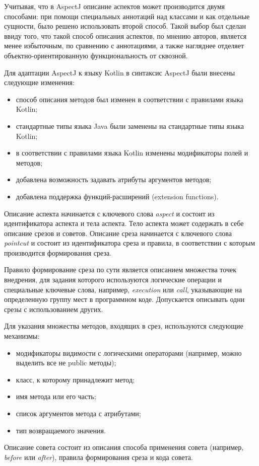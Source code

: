 \documentclass[conference]{IEEEtran}
\begin{document}
Учитывая, что в AspectJ описание аспектов может производится двумя способами:
при помощи специальных аннотаций над классами и как отдельные сущности, было
решено использовать второй способ.
Такой выбор был сделан ввиду того, что такой способ описания аспектов, по мнению
авторов, является менее избыточным, по сравнению с аннотациями, а также
нагляднее отделяет объектно-ориентированную функциональность от сквозной.

Для адаптации AspectJ к языку Kotlin в синтаксис AspectJ были внесены следующие
изменения:
\begin{itemize}
	\item способ описания методов был изменен в соответствии с правилами языка
	      Kotlin;
	\item стандартные типы языка Java были заменены на стандартные типы языка
		  Kotlin;
	\item в соответствии с правилами языка Kotlin изменены модификаторы полей и
	      методов;
	\item добавлена возможность задавать атрибуты аргументов методов;
	\item добавлена поддержка функций-расширений (extension functions).
\end{itemize}

Описание аспекта начинается с ключевого слова \textit{aspect} и состоит из 
идентификатора аспекта и тела аспекта.
Тело аспекта может содержать в себе описание срезов и советов.
Описание среза начинается с ключевого слова \textit{pointcut} и состоит из
идентификатора среза и правила, в соответствии с которым производится
формирования среза.

Правило формирование среза по сути является описанием множества точек внедрения, 
для задания которого используются логические операции и специальные ключевые 
слова, например, \textit{execution} или \textit{call}, указывающие на
определенную группу мест в программном коде.
Допускается описывать одни срезы с использованием других. 

Для указания множества методов, входящих в срез, используются следующие
механизмы:
\begin{itemize}
    \item модификаторы видимости с логическими операторами (например, можно
          выделить все не public методы);
    \item класс, к которому принадлежит метод;
    \item имя метода или его часть;
    \item список аргументов метода с атрибутами;
    \item тип возвращаемого значения.
\end{itemize}
Описание совета состоит из описания способа применения совета (например,
\textit{before} или \textit{after}), правила формирования среза и кода совета.
\end{document}

